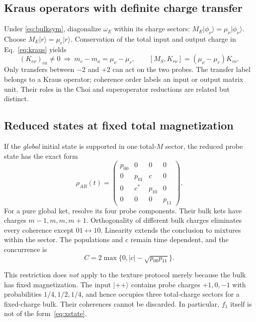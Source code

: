 \documentclass[11pt,a4paper]{article}
\newcommand{\ket}[1]{\lvert #1\rangle}
\begin{document}
\subsection{Kraus operators with definite charge transfer}

Under \eqref{eq:bulksym}, diagonalize $\omega_E$ within its charge
sectors: $M_E\ket{\phi_\nu}=\mu_\nu\ket{\phi_\nu}$. Choose
$M_E\ket r=\mu_r\ket r$. Conservation of the total input and output
charge in Eq.~\eqref{eq:kraus} yields
\begin{equation}
 (K_{r\nu})_{ca}\ne0\ \Longrightarrow\
 m_c-m_a=\mu_\nu-\mu_r,\qquad
 [M_S,K_{r\nu}]=(\mu_\nu-\mu_r)K_{r\nu}.
\end{equation}
Only transfers between $-2$ and $+2$ can act on the two probes.
The transfer label belongs to a Kraus operator; coherence order labels
an input or output matrix unit. Their roles in the Choi and
superoperator reductions are related but distinct.

\subsection{Reduced states at fixed total magnetization}
\label{sec:xstate}

If the \emph{global} initial state is supported in one total-$M$ sector,
the reduced probe state has the exact form
\begin{equation}
 \rho_{AB}(t)=\begin{pmatrix}
 p_{00}&0&0&0\\0&p_{01}&c&0\\0&c^*&p_{10}&0\\0&0&0&p_{11}
 \end{pmatrix}.
 \label{eq:xstate}
\end{equation}
For a pure global ket, resolve its four probe components. Their bulk
kets have charges $m-1,m,m,m+1$. Orthogonality of different bulk charges
eliminates every coherence except $01\leftrightarrow10$. Linearity
extends the conclusion to mixtures within the sector.
The populations and $c$ remain time dependent, and the concurrence is
\begin{equation}
 C=2\max\{0,|c|-\sqrt{p_{00}p_{11}}\}.
\end{equation}

This restriction does \emph{not} apply to the texture protocol merely
because the bulk has fixed magnetization. The input $\ket{++}$ contains
probe charges $+1,0,-1$ with probabilities $1/4,1/2,1/4$, and hence
occupies three total-charge sectors for a fixed-charge bulk. Their
coherences cannot be discarded. In particular, $f_1$ itself is not
of the form~\eqref{eq:xstate}.
\end{document}
